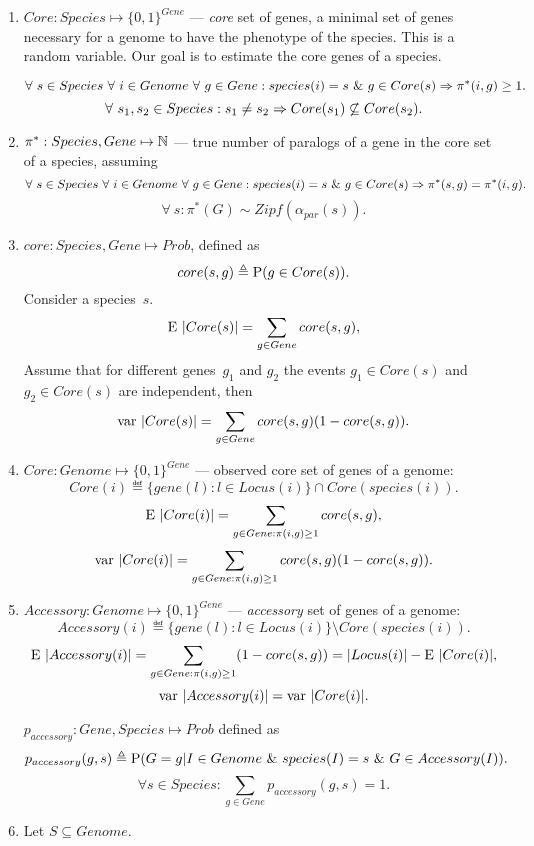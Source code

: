 \documentclass[10pt,a4paper]{article}
\theoremstyle{plain} \newtheorem{Lem}{Lemma}
\begin{document}
\begin{enumerate}
\item
$Core : Species \mapsto \{0,1\}^{Gene}$ --- {\em core} set of genes, a minimal set of genes necessary for a genome to have the phenotype of the species.
This is a random variable.
Our goal is to estimate the core genes of a species.

$$   \forall \  s \in Species 
   \ \forall \  i \in Genome
   \ \forall \  g \in Gene
   : species(i) = s \ \& \  g \in Core(s)
     \Rightarrow \pi^*(i,g) \ge 1. 
$$
$$ \forall \  s_1, s_2 \in Species: s_1 \ne s_2 \Rightarrow Core(s_1) \not \subseteq Core(s_2). $$



\item
$\pi^*: Species, Gene \mapsto \mathbb N$ --- true number of paralogs of a gene in the core set of a species, assuming
$$   \forall \  s \in Species 
   \ \forall \  i \in Genome
   \ \forall \  g \in Gene
   : species(i) = s \ \& \  g \in Core(s)
     \Rightarrow \pi^*(s,g) = \pi^*(i,g). 
$$
$$ \forall \ s : \pi^*(G) \sim \mathit{Zipf}(\alpha_{par}(s)). $$


\item
$core : Species, Gene \mapsto Prob$, defined as
$$ core (s,g) \triangleq \mathrm P(g \in Core(s)). $$
Consider a species~$s$.
$$ \mathrm E \  |Core(s)| = \sum_{g \in Gene} core(s,g), $$
Assume that for different genes~$g_1$ and $g_2$ the events $g_1 \in Core(s)$ and $g_2 \in Core(s)$ are independent, then
$$ \mathrm {var} \  |Core(s)| = \sum_{g \in Gene} core(s,g) (1 - core(s,g)). $$

\item
$Core: Genome \mapsto \{0,1\}^{Gene}$ --- observed core set of genes of a genome:
$$ Core(i) \eqdef \{gene(l): l \in Locus(i)\} \cap Core(species(i)). $$
$$ \mathrm E \  |Core(i)| = \sum_{g \in Gene: \pi(i,g) \ge 1} core(s,g), $$
$$ \mathrm {var} \  |Core(i)| = \sum_{g \in Gene: \pi(i,g) \ge 1} core(s,g) (1 - core(s,g)). $$

\item
$Accessory: Genome \mapsto \{0,1\}^{Gene}$ --- {\em accessory} set of genes of a genome:
$$Accessory(i) \eqdef \{gene(l): l \in Locus(i)\} \setminus Core(species(i)). $$
$$ \mathrm E \  |Accessory(i)| = \sum_{g \in Gene: \pi(i,g) \ge 1} (1-core(s,g)) = |Locus(i)| - \mathrm E \  |Core(i)|, $$
$$ \mathrm {var} \  |Accessory(i)| = \mathrm {var} \  |Core(i)|. $$


$p_{accessory}: Gene, Species \mapsto Prob$ defined as
$$ p_{accessory} (g,s) \triangleq \mathrm P(G = g | I \in Genome \ \& \  species(I) = s \ \& \  G \in Accessory(I)). $$
$$ \forall s \in Species: \sum_{g \in Gene} p_{accessory}(g,s)= 1. $$


\item
Let $S \subseteq Genome$.


\end{enumerate}
\end{document}
